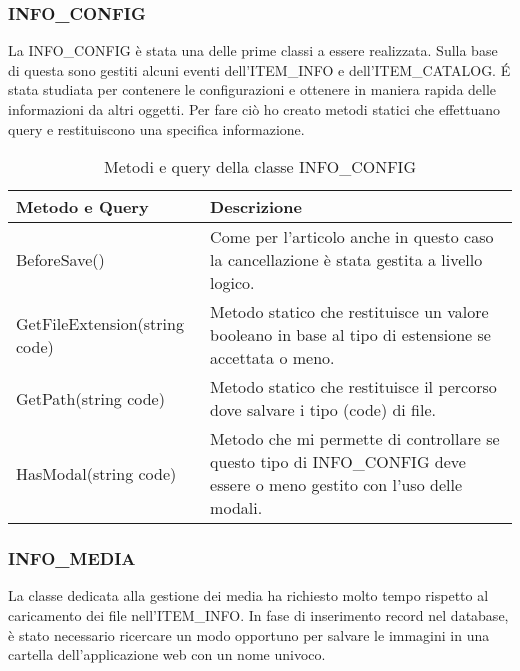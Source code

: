 \subsubsection{INFO\_CONFIG}
La INFO\_CONFIG è stata una delle prime classi a essere realizzata. Sulla base di questa sono gestiti alcuni eventi dell'ITEM\_INFO e dell'ITEM\_CATALOG. \'E stata studiata per contenere le configurazioni e ottenere in maniera rapida delle informazioni da altri oggetti. Per fare ciò ho creato metodi statici che effettuano query e restituiscono una specifica informazione.

	\begin{table}[h]
		\centering
		\begin{tabular}{ p{4cm}|p{} }
			\hline
			\textbf{Metodo e Query} & \textbf{Descrizione}\\
			\hline
			BeforeSave()		& Come per l'articolo anche in questo caso la cancellazione è stata gestita a livello logico.\\
			\hline
			GetFileExtension(string code)	& Metodo statico che restituisce un valore booleano in base al tipo di estensione se accettata o meno.\\
			\hline
			GetPath(string code) & Metodo statico che restituisce il percorso dove salvare i tipo (code) di file.\\
			\hline
			HasModal(string code) & Metodo che mi permette di controllare se questo tipo di INFO\_CONFIG deve essere o meno gestito con l'uso delle modali.\\
	
		\end{tabular}
	\caption{Metodi e query della classe INFO\_CONFIG}
	\end{table}

\subsubsection{INFO\_MEDIA}
La classe dedicata alla gestione dei media ha richiesto molto tempo rispetto al caricamento dei file nell'ITEM\_INFO. In fase di inserimento record nel database, è stato necessario ricercare un modo opportuno per salvare le immagini in una cartella dell'applicazione web con un nome univoco.

